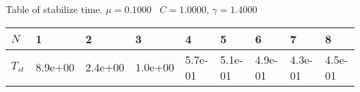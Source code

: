 \begin{center}
Table of stabilize time. $\mu = 0.1000$ \, $C = 1.0000$, $\gamma = 1.4000$
  
\begin{tabular}{|p{0.6in}|p{0.6in}|p{0.6in}|p{0.6in}|p{0.6in}|p{0.6in}|p{0.6in}|p{0.6in}|p{0.6in}|} \hline
$N$ &1 &2 &3 &4 &5 &6 &7 &8 \\ \hline 
$T_{st}$ &8.9e+00 &2.4e+00 &1.0e+00 &5.7e-01 &5.1e-01 &4.9e-01 &4.3e-01 &4.5e-01 \\ \hline 

\end{tabular}\\[20pt]
\end{center}
